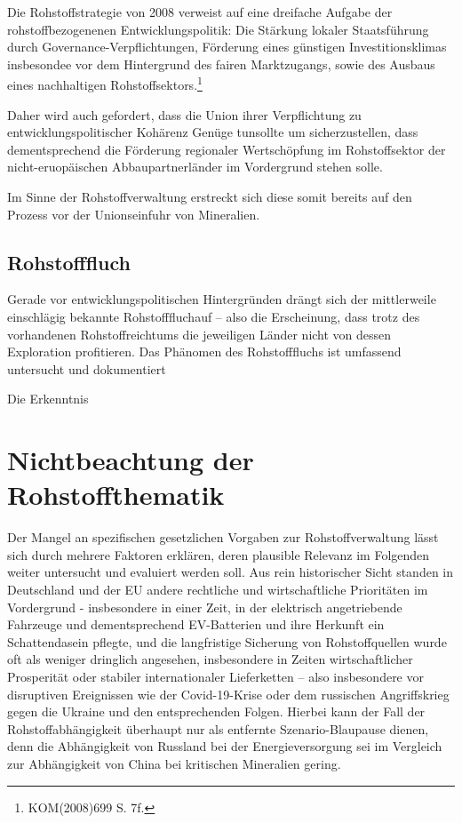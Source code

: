 \documentclass[12pt,a4paper,oneside]{book} %
\begin{document}
Die Rohstoffstrategie von 2008 verweist auf eine dreifache Aufgabe der rohstoffbezogenenen Entwicklungspolitik: Die Stärkung lokaler Staatsführung durch Governance-Verpflichtungen, Förderung eines günstigen Investitionsklimas insbesondee vor dem Hintergrund des fairen Marktzugangs, sowie des Ausbaus eines nachhaltigen Rohstoffsektors.\footnote{KOM(2008)699 S. 7f.}

Daher wird auch gefordert, dass die Union \glqq ihrer Verpflichtung zu entwicklungspolitischer Kohärenz Genüge tun\grqq sollte um sicherzustellen, dass dementsprechend die Förderung regionaler Wertschöpfung im Rohstoffsektor der nicht-eruopäischen Abbaupartnerländer im Vordergrund stehen solle.\autocite[15]{Kueblboeck_2023}

Im Sinne der Rohstoffverwaltung erstreckt sich diese somit bereits auf den Prozess vor der Unionseinfuhr von Mineralien.

\subsection{Rohstofffluch}

Gerade vor entwicklungspolitischen Hintergründen drängt sich der mittlerweile einschlägig bekannte \glqq Rohstofffluch\grqq auf -- also die Erscheinung, dass trotz des vorhandenen Rohstoffreichtums die jeweiligen Länder nicht von dessen Exploration profitieren. Das Phänomen des Rohstofffluchs ist umfassend untersucht und dokumentiert

Die Erkenntnis




\section{Nichtbeachtung der Rohstoffthematik}
Der Mangel an spezifischen gesetzlichen Vorgaben zur Rohstoffverwaltung lässt sich durch mehrere Faktoren erklären, deren plausible Relevanz im Folgenden weiter untersucht und evaluiert werden soll. Aus rein historischer Sicht standen in Deutschland und der EU andere rechtliche und wirtschaftliche Prioritäten im Vordergrund - insbesondere in einer Zeit, in der elektrisch angetriebende Fahrzeuge und dementsprechend EV-Batterien und ihre Herkunft ein Schattendasein pflegte, und die langfristige Sicherung von Rohstoffquellen wurde oft als weniger dringlich angesehen, insbesondere in Zeiten wirtschaftlicher Prosperität oder stabiler internationaler Lieferketten – also insbesondere vor disruptiven Ereignissen wie der Covid-19-Krise oder dem russischen Angriffskrieg gegen die Ukraine und den entsprechenden Folgen. Hierbei kann der Fall der Rohstoffabhängigkeit überhaupt nur als entfernte Szenario-Blaupause dienen, denn die Abhängigkeit von Russland bei der Energieversorgung sei im Vergleich zur Abhängigkeit von China bei kritischen Mineralien gering.\autocite{Rachman, FT}
\end{document}
